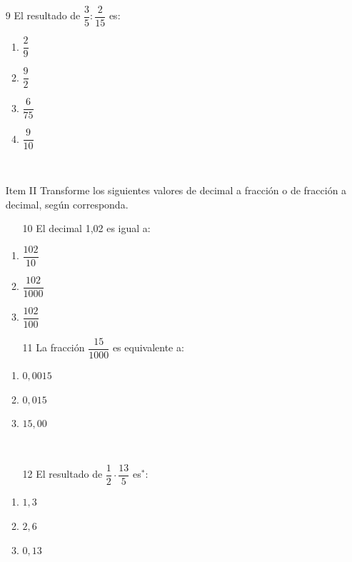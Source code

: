 \documentclass[12pt]{article}
\begin{document}
\begin{enumerate}
	\item [9]El resultado de $\dfrac{3}{5} : \dfrac{2}{15}$	es:
	\begin{enumerate}
		\item $\dfrac{2}{9}$\\
		\item $\dfrac{9}{2}$\\
		\item $\dfrac{6}{75}$\\
		\item $\dfrac{9}{10}$\\
	\end{enumerate}
\ \\
\item [Item II] Transforme los siguientes valores de decimal a fracción o de fracción a decimal, según corresponda. 
\begin{multicols}{2}
	\begin{enumerate}
		\item [10] El decimal 1,02 es igual a:
	\end{enumerate}
		\begin{enumerate}
			\item $\dfrac{102}{10}$\\
			\item $\dfrac{102}{1000}$\\
			\item $\dfrac{102}{100}$\\
			\end{enumerate}

	\begin{enumerate}
		\item [11]La fracción $\dfrac{15}{1000}$	 es equivalente a:
			\end{enumerate}
		\begin{enumerate}
			\item $0,0015$\\
			\item $0,015$\\
			\item $15,00$\\
	\end{enumerate}
\end{multicols}
\ \\ 
	\begin{enumerate}
		\item [12]El resultado de $\dfrac{1}{2} \cdot \dfrac{13}{5}$  es$^\ast$: 		\\
			\end{enumerate}
		\begin{enumerate}
			\item $1,3$\\
			\item $2,6$\\
			\item $0,13$\\
			

\end{enumerate}
\end{enumerate}
\end{document}
